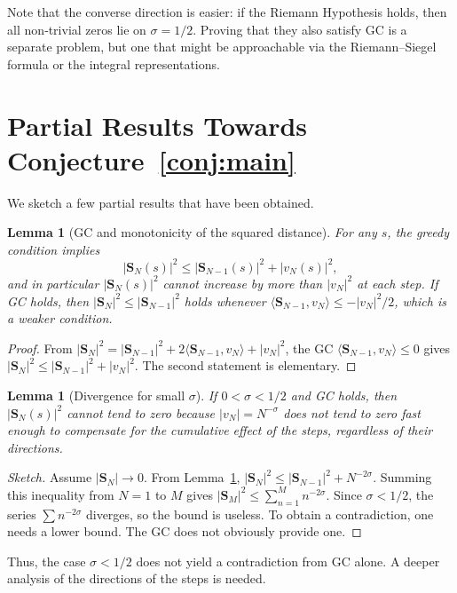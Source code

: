 \documentclass[11pt,a4paper]{article}
\newtheorem{lemma}[theorem]{Lemma}
\begin{document}
Note that the converse direction is easier: if the Riemann Hypothesis holds, then all non‑trivial zeros lie on $\sigma=1/2$.  Proving that they also satisfy GC is a separate problem, but one that might be approachable via the Riemann–Siegel formula or the integral representations.

\section{Partial Results Towards Conjecture~\ref{conj:main}}
We sketch a few partial results that have been obtained.

\begin{lemma}[GC and monotonicity of the squared distance]\label{lem:monotone}
For any $s$, the greedy condition implies
\[
|\mathbf{S}_N(s)|^2 \le |\mathbf{S}_{N-1}(s)|^2 + |v_N(s)|^2,
\]
and in particular $|\mathbf{S}_N(s)|^2$ cannot increase by more than $|v_N|^2$ at each step.  If GC holds, then $|\mathbf{S}_N|^2 \le |\mathbf{S}_{N-1}|^2$ holds whenever $\langle\mathbf{S}_{N-1},v_N\rangle \le -|v_N|^2/2$, which is a weaker condition.
\end{lemma}
\begin{proof}
From $|\mathbf{S}_N|^2 = |\mathbf{S}_{N-1}|^2 + 2\langle\mathbf{S}_{N-1},v_N\rangle + |v_N|^2$, the GC $\langle\mathbf{S}_{N-1},v_N\rangle\le 0$ gives $|\mathbf{S}_N|^2 \le |\mathbf{S}_{N-1}|^2 + |v_N|^2$.  The second statement is elementary.
\end{proof}

\begin{lemma}[Divergence for small $\sigma$]\label{lem:small-sigma}
If $0<\sigma<1/2$ and GC holds, then $|\mathbf{S}_N(s)|^2$ cannot tend to zero because $|v_N|=N^{-\sigma}$ does not tend to zero fast enough to compensate for the cumulative effect of the steps, regardless of their directions.
\end{lemma}
\begin{proof}[Sketch]
Assume $|\mathbf{S}_N|\to 0$.  From Lemma~\ref{lem:monotone}, $|\mathbf{S}_N|^2 \le |\mathbf{S}_{N-1}|^2 + N^{-2\sigma}$.  Summing this inequality from $N=1$ to $M$ gives $|\mathbf{S}_M|^2 \le \sum_{n=1}^{M} n^{-2\sigma}$.  Since $\sigma<1/2$, the series $\sum n^{-2\sigma}$ diverges, so the bound is useless.  To obtain a contradiction, one needs a lower bound.  The GC does not obviously provide one.
\end{proof}

Thus, the case $\sigma<1/2$ does not yield a contradiction from GC alone.  A deeper analysis of the directions of the steps is needed.
\end{document}
